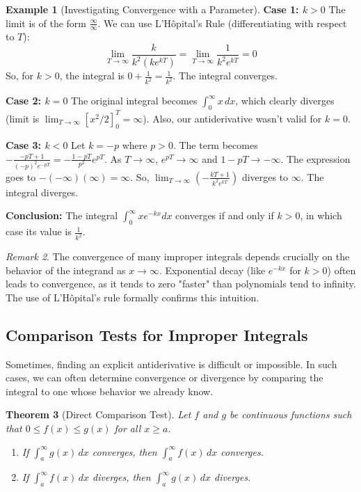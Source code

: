\documentclass[11pt]{article}
\newtheorem{theorem}{Theorem}[section]
\theoremstyle{definition}
\newtheorem{example}[theorem]{Example}
\theoremstyle{remark}
\newtheorem{remark}[theorem]{Remark}
\begin{document}
\begin{example}[Investigating Convergence with a Parameter]
\textbf{Case 1: $k > 0$}
The limit is of the form $\frac{\infty}{\infty}$. We can use L'Hôpital's Rule (differentiating with respect to $T$):
\[ \lim_{T \to \infty} \frac{k}{k^2 (k e^{kT})} = \lim_{T \to \infty} \frac{1}{k^2 e^{kT}} = 0 \]
So, for $k>0$, the integral is $0 + \frac{1}{k^2} = \frac{1}{k^2}$. The integral converges.

\textbf{Case 2: $k = 0$}
The original integral becomes $\int_0^\infty x \, dx$, which clearly diverges (limit is $\lim_{T\to\infty} [x^2/2]_0^T = \infty$). Also, our antiderivative wasn't valid for $k=0$.

\textbf{Case 3: $k < 0$}
Let $k = -p$ where $p > 0$. The term becomes $-\frac{-pT+1}{(-p)^2 e^{-pT}} = -\frac{1-pT}{p^2} e^{pT}$.
As $T \to \infty$, $e^{pT} \to \infty$ and $1-pT \to -\infty$. The expression goes to $-(-\infty)(\infty) = \infty$.
So, $\lim_{T \to \infty} \left( -\frac{kT+1}{k^2 e^{kT}} \right)$ diverges to $\infty$. The integral diverges.

\textbf{Conclusion:} The integral $\int_0^\infty x e^{-kx} dx$ converges if and only if $k > 0$, in which case its value is $\frac{1}{k^2}$.
\end{example}

\begin{remark}
The convergence of many improper integrals depends crucially on the behavior of the integrand as $x \to \infty$. Exponential decay (like $e^{-kx}$ for $k>0$) often leads to convergence, as it tends to zero "faster" than polynomials tend to infinity. The use of L'Hôpital's rule formally confirms this intuition.
\end{remark}

\subsection{Comparison Tests for Improper Integrals}

Sometimes, finding an explicit antiderivative is difficult or impossible. In such cases, we can often determine convergence or divergence by comparing the integral to one whose behavior we already know.

\begin{theorem}[Direct Comparison Test]
Let $f$ and $g$ be continuous functions such that $0 \le f(x) \le g(x)$ for all $x \ge a$.
\begin{enumerate}
    \item If $\int_a^\infty g(x)\,dx$ converges, then $\int_a^\infty f(x)\,dx$ converges.
    \item If $\int_a^\infty f(x)\,dx$ diverges, then $\int_a^\infty g(x)\,dx$ diverges.
\end{enumerate}
\end{theorem}
\end{document}
